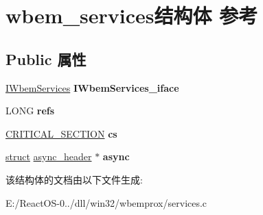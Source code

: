 \hypertarget{structwbem__services}{}\section{wbem\+\_\+services结构体 参考}
\label{structwbem__services}
\subsection*{Public 属性}
\begin{DoxyCompactItemize}
\item 
\mbox{\label{structwbem__services_a898da75a55f8416964846add43b29d98}} 
\hyperlink{interface_i_wbem_services}{I\+Wbem\+Services} {\bfseries I\+Wbem\+Services\+\_\+iface}
\item 
\mbox{\label{structwbem__services_a63e7b4c68b710c6e068bdebdb244b15f}} 
L\+O\+NG {\bfseries refs}
\item 
\mbox{\label{structwbem__services_a45269c592a6f3ff353e53da153d3dd8e}} 
\hyperlink{struct___c_r_i_t_i_c_a_l___s_e_c_t_i_o_n}{C\+R\+I\+T\+I\+C\+A\+L\+\_\+\+S\+E\+C\+T\+I\+ON} {\bfseries cs}
\item 
\mbox{\label{structwbem__services_a45c0f624847364458158210d921b36e6}} 
\hyperlink{interfacestruct}{struct} \hyperlink{structasync__header}{async\+\_\+header} $\ast$ {\bfseries async}
\end{DoxyCompactItemize}


该结构体的文档由以下文件生成\+:\begin{DoxyCompactItemize}
\item 
E\+:/\+React\+O\+S-\/0../dll/win32/wbemprox/services.\+c\end{DoxyCompactItemize}
